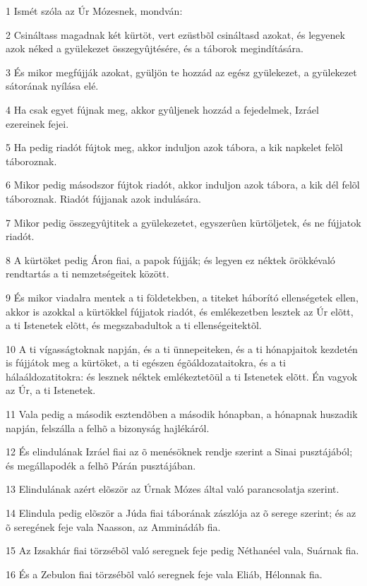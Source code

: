 \par 1 Ismét szóla az Úr Mózesnek, mondván:
\par 2 Csináltass magadnak két kürtöt, vert ezüstbõl csináltasd azokat, és legyenek azok néked a gyülekezet összegyûjtésére, és a táborok megindítására.
\par 3 És mikor megfújják azokat, gyüljön te hozzád az egész gyülekezet, a gyülekezet sátorának nyílása elé.
\par 4 Ha csak egyet fújnak meg, akkor gyûljenek hozzád a fejedelmek, Izráel ezereinek fejei.
\par 5 Ha pedig riadót fújtok meg, akkor induljon azok tábora, a kik napkelet felõl táboroznak.
\par 6 Mikor pedig másodszor fújtok riadót, akkor induljon azok tábora, a kik dél felõl táboroznak. Riadót fújjanak azok indulására.
\par 7 Mikor pedig összegyûjtitek a gyülekezetet, egyszerûen kürtöljetek, és ne fújjatok riadót.
\par 8 A kürtöket pedig Áron fiai, a papok fújják; és legyen ez néktek örökkévaló rendtartás a ti nemzetségeitek között.
\par 9 És mikor viadalra mentek a ti földetekben, a titeket háborító ellenségetek ellen, akkor is azokkal a kürtökkel fújjatok riadót, és emlékezetben lesztek az Úr elõtt, a ti Istenetek elõtt, és megszabadultok a ti ellenségeitektõl.
\par 10 A ti vígasságtoknak napján, és a ti ünnepeiteken, és a ti hónapjaitok kezdetén is fújjátok meg a kürtöket, a ti egészen égõáldozataitokra, és a ti hálaáldozatitokra: és lesznek néktek emlékeztetõül a ti Istenetek elõtt. Én vagyok az Úr, a ti Istenetek.
\par 11 Vala pedig a második esztendõben a második hónapban, a hónapnak huszadik napján, felszálla a felhõ a bizonyság hajlékáról.
\par 12 És elindulának Izráel fiai az õ menésöknek rendje szerint a Sinai pusztájából; és megállapodék a felhõ Párán pusztájában.
\par 13 Elindulának azért elõször az Úrnak Mózes által való parancsolatja szerint.
\par 14 Elindula pedig elõször a Júda fiai táborának zászlója az õ serege szerint; és az õ seregének feje vala Naasson, az Amminádáb fia.
\par 15 Az Izsakhár fiai törzsébõl való seregnek feje pedig Néthanéel vala, Suárnak fia.
\par 16 És a Zebulon fiai törzsébõl való seregnek feje vala Eliáb, Hélonnak fia.
